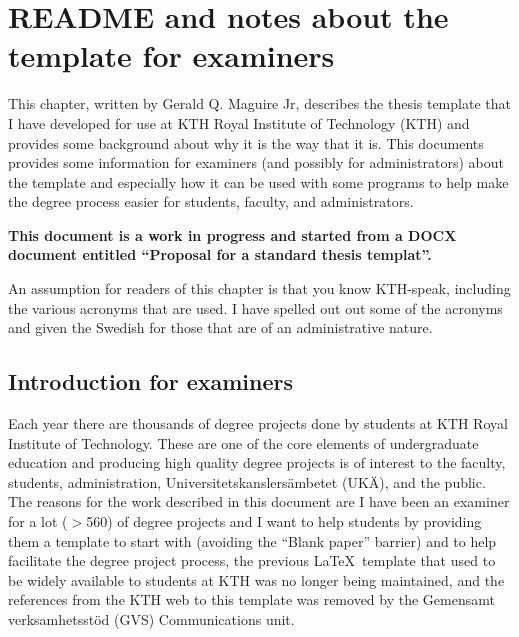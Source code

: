 %


\chapter{README and notes about the template for examiners}
\label{ch:readme_examiner}

This chapter, written by Gerald Q. Maguire Jr, describes the thesis template that I have developed for use at KTH Royal Institute of Technology (KTH) and provides some background about why it is the way that it is. This documents provides some information for examiners (and possibly for administrators) about the template and especially how it can be used with some programs to help make the degree process easier for students, faculty, and administrators.

\textbf{This document is a work in progress and started from a DOCX document entitled ``Proposal for a standard thesis templat''.}

An assumption for readers of this chapter is that you know KTH-speak, including the various acronyms that are used. I have spelled out out some of the acronyms and given the Swedish for those that are of an administrative nature.

\section{Introduction for examiners}
\label{sec:IntroForExaminers}

Each year there are thousands of degree projects done by students at KTH Royal Institute of Technology. These are one of the core elements of undergraduate education and producing high quality degree projects is of interest to the faculty, students, administration, Universitetskanslersämbetet (UKÄ), and the public. The reasons for the work described in this document are \first I have been an examiner for a lot ($>$560) of degree projects and I want to help students by providing them a template to start with (avoiding the ``Blank paper'' barrier) and to help facilitate the degree project process, \Second the previous \LaTeX~template that used to be widely available to students at KTH was no longer being maintained, and \third the references from the KTH web to this template was removed by the Gemensamt verksamhetsstöd (GVS) Communications unit.

